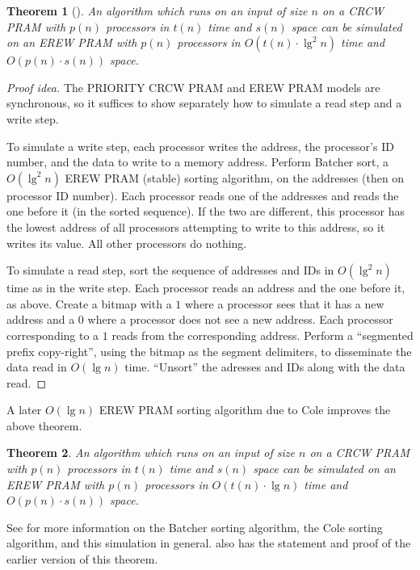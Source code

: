 \documentclass{article}
\newtheorem{theorem}{Theorem}
\newenvironment{idea}{\begin{proof}[Proof idea]}{\end{proof}}
\begin{document}
\begin{theorem}[\cite{vishkin83}]
  An algorithm which runs on an input of size $n$ on a CRCW PRAM with $p(n)$ processors in $t(n)$ time and $s(n)$ space can be simulated on an EREW PRAM with $p(n)$ processors in $O(t(n)\cdot \lg^2 n)$ time and $O(p(n) \cdot s(n))$ space.
\end{theorem}
\begin{idea}
  The PRIORITY CRCW PRAM and EREW PRAM models are synchronous, so it suffices to show separately how to simulate a read step and a write step.

  To simulate a write step, each processor writes the address, the processor's ID number, and the data to write to a memory address.
  Perform Batcher sort, a $O(\lg^2 n)$ EREW PRAM (stable) sorting algorithm, on the addresses (then on processor ID number).
  Each processor reads one of the addresses and reads the one before it (in the sorted sequence).
  If the two are different, this processor has the lowest address of all processors attempting to write to this address, so it writes its value.
  All other processors do nothing.

  To simulate a read step, sort the sequence of addresses and IDs in $O(\lg^2 n)$ time as in the write step.
  Each processor reads an address and the one before it, as above.
  Create a bitmap with a $1$ where a processor sees that it has a new address and a $0$ where a processor does not see a new address.
  Each processor corresponding to a $1$ reads from the corresponding address.
  Perform a ``segmented prefix copy-right'', using the bitmap as the segment delimiters, to disseminate the data read in $O(\lg n)$ time.
  ``Unsort'' the adresses and IDs along with the data read.
\end{idea}

A later $O(\lg n)$ EREW PRAM sorting algorithm due to Cole improves the above theorem.

\begin{theorem}
  An algorithm which runs on an input of size $n$ on a CRCW PRAM with $p(n)$ processors in $t(n)$ time and $s(n)$ space can be simulated on an EREW PRAM with $p(n)$ processors in $O(t(n)\cdot \lg n)$ time and $O(p(n) \cdot s(n))$ space.
\end{theorem}

See \cite{smith93} for more information on the Batcher sorting algorithm, the Cole sorting algorithm, and this simulation in general.
\cite{savage98} also has the statement and proof of the earlier version of this theorem.
\end{document}
